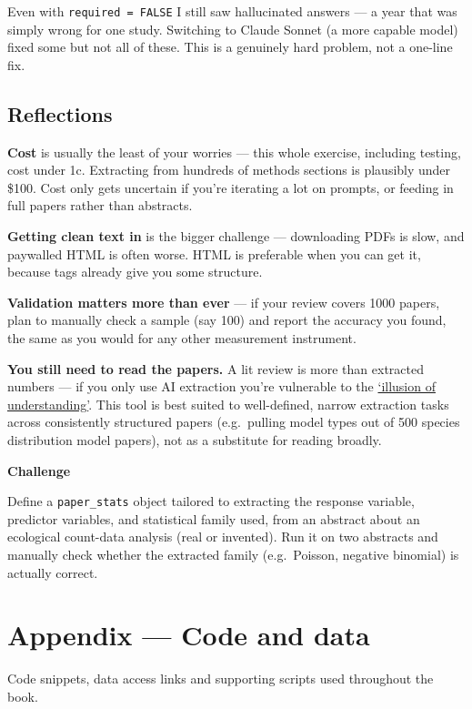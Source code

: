 \documentclass[
  letterpaper,
  DIV=11,
  numbers=noendperiod]{scrreprt}
\begin{document}
Even with \texttt{required\ =\ FALSE} I still saw hallucinated answers
--- a year that was simply wrong for one study. Switching to Claude
Sonnet (a more capable model) fixed some but not all of these. This is a
genuinely hard problem, not a one-line fix.

\section{Reflections}\label{reflections}

\textbf{Cost} is usually the least of your worries --- this whole
exercise, including testing, cost under 1c. Extracting from hundreds of
methods sections is plausibly under \$100. Cost only gets uncertain if
you're iterating a lot on prompts, or feeding in full papers rather than
abstracts.

\textbf{Getting clean text in} is the bigger challenge --- downloading
PDFs is slow, and paywalled HTML is often worse. HTML is preferable when
you can get it, because tags already give you some structure.

\textbf{Validation matters more than ever} --- if your review covers
1000 papers, plan to manually check a sample (say 100) and report the
accuracy you found, the same as you would for any other measurement
instrument.

\textbf{You still need to read the papers.} A lit review is more than
extracted numbers --- if you only use AI extraction you're vulnerable to
the \href{https://www.nature.com/articles/s41586-024-07146-0}{`illusion
of understanding'}. This tool is best suited to well-defined, narrow
extraction tasks across consistently structured papers (e.g.~pulling
model types out of 500 species distribution model papers), not as a
substitute for reading broadly.

\begin{tcolorbox}[enhanced jigsaw, toprule=.15mm, rightrule=.15mm, left=2mm, leftrule=.75mm, breakable, opacityback=0, arc=.35mm, colframe=quarto-callout-important-color-frame, bottomrule=.15mm, colback=white]
\begin{minipage}[t]{5.5mm}
\textcolor{quarto-callout-important-color}{\faExclamation}
\end{minipage}%
\begin{minipage}[t]{\textwidth - 5.5mm}

\vspace{-3mm}\textbf{Challenge}\vspace{3mm}

Define a \texttt{paper\_stats} object tailored to extracting the
response variable, predictor variables, and statistical family used,
from an abstract about an ecological count-data analysis (real or
invented). Run it on two abstracts and manually check whether the
extracted family (e.g.~Poisson, negative binomial) is actually correct.

\end{minipage}%
\end{tcolorbox}


\chapter{Appendix --- Code and data}\label{appendix-code-and-data}

Code snippets, data access links and supporting scripts used throughout
the book.
\end{document}

